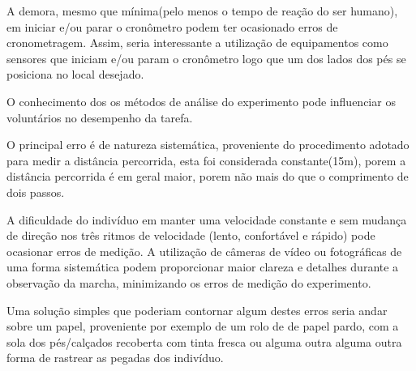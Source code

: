 \documentclass[a4paper,10pt]{article}
\begin{document}
A demora, mesmo que mínima(pelo menos o tempo de reação do ser humano), em iniciar e/ou parar o cronômetro podem ter ocasionado erros de cronometragem. Assim, seria interessante a utilização de equipamentos como sensores que iniciam e/ou param o cronômetro logo que um dos lados dos pés se posiciona no local desejado.

O conhecimento dos os métodos de análise do experimento pode influenciar os voluntários no desempenho da tarefa. 

O principal erro é de natureza sistemática, proveniente do procedimento adotado para medir a distância percorrida, esta foi considerada constante(15m), porem a distância percorrida é em geral maior, porem não mais do que o comprimento de dois passos.

A dificuldade do indivíduo em manter uma velocidade constante e sem mudança de direção nos três ritmos de velocidade (lento, confortável e rápido) pode ocasionar erros de medição. A utilização de câmeras de vídeo ou fotográficas de uma forma sistemática podem proporcionar maior clareza e detalhes durante a observação da marcha, minimizando os erros de medição do experimento.

Uma solução simples que poderiam contornar algum destes erros seria andar sobre um papel, proveniente por exemplo de um rolo de de papel pardo, com a sola dos pés/calçados recoberta com tinta fresca ou alguma outra alguma outra forma de rastrear as pegadas dos indivíduo.
\end{document}
